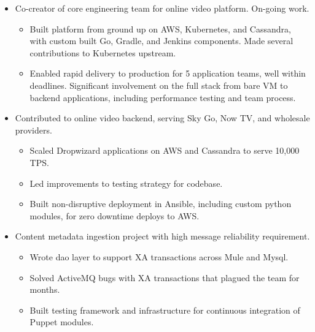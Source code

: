 \documentclass[11pt,a4paper,roman]{moderncv}
\begin{document}
\vspace{5mm}

\begin{itemize}
\item Co-creator of core engineering team for online video platform. On-going work.
  \begin{itemize}
  \item Built platform from ground up on AWS, Kubernetes, and Cassandra, with custom built Go, Gradle, and Jenkins components. Made several contributions to Kubernetes upstream.
  \item Enabled rapid delivery to production for 5 application teams, well within deadlines. Significant involvement on the full stack from bare VM to backend applications, including performance testing and team process.
  \end{itemize}
\item Contributed to online video backend, serving Sky Go, Now TV, and wholesale providers.
  \begin{itemize}
  \item Scaled Dropwizard applications on AWS and Cassandra to serve 10,000 TPS.\@
  \item Led improvements to testing strategy for codebase.
  \item Built non-disruptive deployment in Ansible, including custom python modules, for zero downtime deploys to AWS.\@
  \end{itemize}
\item Content metadata ingestion project with high message reliability requirement.
  \begin{itemize}
  \item Wrote dao layer to support XA transactions across Mule and Mysql.
  \item Solved ActiveMQ bugs with XA transactions that plagued the team for months.
  \item Built testing framework and infrastructure for continuous integration of Puppet modules.
  \end{itemize}
\end{itemize}

\vspace{5mm}
\end{document}
